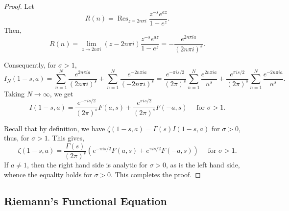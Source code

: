 \documentclass[12pt]{article}
\theoremstyle{thmstyle}
\theoremstyle{defstyle}
\newcommand{\Res}{\operatorname{Res}}
\begin{document}
\begin{proof}
    Let 
    \begin{equation*}
        R(n) = \Res_{z = 2n\pi i}\frac{z^{-s}e^{az}}{1 - e^z}.
    \end{equation*}
    Then, 
    \begin{equation*}
        R(n) = \lim_{z\to2n\pi i}(z - 2n\pi i)\frac{z^{-s}e^{az}}{1 - e^z} = -\frac{e^{2n\pi i a}}{(2n\pi i)^s}.
    \end{equation*}

    Consequently, for $\sigma > 1$, 
    \begin{equation*}
        I_N(1 - s, a) = \sum_{n = 1}^N\frac{e^{2n\pi i a}}{(2n\pi i)^s} + \sum_{n = 1}^N\frac{e^{-2n\pi i a}}{(-2n\pi i)^s} = \frac{e^{-\pi i s/2}}{(2\pi)^s}\sum_{n = 1}^N\frac{e^{2n\pi ia}}{n^s} + \frac{e^{\pi i s/2}}{(2\pi)^s}\sum_{n = 1}^N\frac{e^{-2n\pi ia}}{n^s}.
    \end{equation*}
    Taking $N\to\infty$, we get
    \begin{equation*}
        I(1 - s, a) = \frac{e^{-\pi is/2}}{(2\pi)^s}F(a, s) + \frac{e^{\pi is/2}}{(2\pi)^s}F(-a, s)\quad\text{ for }\sigma > 1.
    \end{equation*}

    Recall that by definition, we have $\zeta(1 - s, a) = \Gamma(s)I(1 - s, a)$ for $\sigma > 0$, thus, for $\sigma > 1$. This gives, 
    \begin{equation*}
        \zeta(1 - s, a) = \frac{\Gamma(s)}{(2\pi)^s}\left(e^{-\pi is/2}F(a, s) + e^{\pi is/2}F(-a, s)\right)\quad\text{ for }\sigma > 1.
    \end{equation*}
    If $a\ne 1$, then the right hand side is analytic for $\sigma > 0$, as is the left hand side, whence the equality holds for $\sigma > 0$. This completes the proof.
\end{proof}

\subsection{Riemann's Functional Equation}
\end{document}
